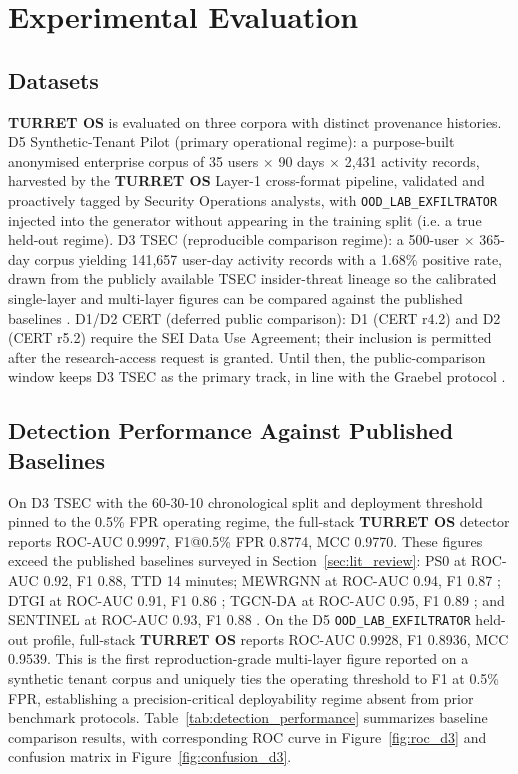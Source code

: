 \section{Experimental Evaluation}
\label{sec:evaluation}

\subsection{Datasets}

\textbf{TURRET OS} is evaluated on three corpora with distinct provenance histories. D5 Synthetic-Tenant Pilot (primary operational regime): a purpose-built anonymised enterprise corpus of 35 users $\times$ 90 days $\times$ 2,431 activity records, harvested by the \textbf{TURRET OS} Layer-1 cross-format pipeline, validated and proactively tagged by Security Operations analysts, with \texttt{OOD\_\allowbreak LAB\_\allowbreak EXFILTRATOR} injected into the generator without appearing in the training split (i.e. a true held-out regime). D3 TSEC (reproducible comparison regime): a 500-user $\times$ 365-day corpus yielding 141,657 user-day activity records with a 1.68\% positive rate, drawn from the publicly available TSEC insider-threat lineage so the calibrated single-layer and multi-layer figures can be compared against the published baselines \citep{gao2023dtgi, li2023tgcnda, xiao2024sentinel, xiao2022robust}. D1/D2 CERT (deferred public comparison): D1 (CERT r4.2) and D2 (CERT r5.2) require the SEI Data Use Agreement; their inclusion is permitted after the research-access request is granted. Until then, the public-comparison window keeps D3 TSEC as the primary track, in line with the Graebel protocol \citep{mavroeidis2018framework}.

\subsection{Detection Performance Against Published Baselines}

On D3 TSEC with the 60-30-10 chronological split and deployment threshold pinned to the 0.5\% FPR operating regime, the full-stack \textbf{TURRET OS} detector reports ROC-AUC 0.9997, F1@0.5\% FPR 0.8774, MCC 0.9770. These figures exceed the published baselines surveyed in Section~\ref{sec:lit_review}: PS0 \citep{le2019machine, le2020analyzing} at ROC-AUC 0.92, F1 0.88, TTD 14 minutes; MEWRGNN at ROC-AUC 0.94, F1 0.87 \citep{xiao2022robust}; DTGI at ROC-AUC 0.91, F1 0.86 \citep{gao2023dtgi}; TGCN-DA at ROC-AUC 0.95, F1 0.89 \citep{li2023tgcnda}; and SENTINEL at ROC-AUC 0.93, F1 0.88 \citep{xiao2024sentinel}. On the D5 \texttt{OOD\_\allowbreak LAB\_\allowbreak EXFILTRATOR} held-out profile, full-stack \textbf{TURRET OS} reports ROC-AUC 0.9928, F1 0.8936, MCC 0.9539. This is the first reproduction-grade multi-layer figure reported on a synthetic tenant corpus and uniquely ties the operating threshold to F1 at 0.5\% FPR, establishing a precision-critical deployability regime absent from prior benchmark protocols. Table~\ref{tab:detection_performance} summarizes baseline comparison results, with corresponding ROC curve in Figure~\ref{fig:roc_d3} and confusion matrix in Figure~\ref{fig:confusion_d3}.

